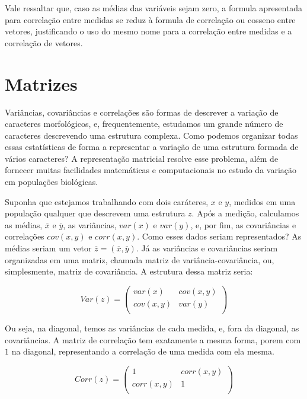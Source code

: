 \documentclass[portuges,]{tufte-handout}
\begin{document}
Vale ressaltar que, caso as médias das variáveis sejam zero, a formula
apresentada para correlação entre medidas se reduz à formula de
correlação ou cosseno entre vetores, justificando o uso do mesmo nome
para a correlação entre medidas e a correlação de vetores.

\section{Matrizes}\label{matrizes}

Variâncias, covariâncias e correlações são formas de descrever a
variação de caracteres morfológicos, e, frequentemente, estudamos um
grande número de caracteres descrevendo uma estrutura complexa. Como
podemos organizar todas essas estatísticas de forma a representar a
variação de uma estrutura formada de vários caracteres? A representação
matricial resolve esse problema, além de fornecer muitas facilidades
matemáticas e computacionais no estudo da variação em populações
biológicas.

Suponha que estejamos trabalhando com dois caráteres, $x$ e $y$, medidos
em uma população qualquer que descrevem uma estrutura $z$. Após a
medição, calculamos as médias, $\overline x$ e $\overline y$, as
variâncias, $var(x)$ e $var(y)$, e, por fim, as covariâncias e
correlações $cov(x, y)$ e $corr(x, y)$. Como esses dados seriam
representados? As médias seriam um vetor
$\overline z = (\overline x, \overline y)$. Já as variâncias e
covariâncias seriam organizadas em uma matriz, chamada matriz de
variância-covariância, ou, simplesmente, matriz de covariância. A
estrutura dessa matriz seria:

\[
Var(z) = \left (
\begin{smallmatrix}
var(x) & cov(x, y) \\
cov(x,y) & var(y)  \\
\end{smallmatrix}
\right )
\]

Ou seja, na diagonal, temos as variâncias de cada medida, e, fora da
diagonal, as covariâncias. A matriz de correlação tem exatamente a mesma
forma, porem com $1$ na diagonal, representando a correlação de uma
medida com ela mesma.

\[
Corr(z) = \left (
\begin{smallmatrix}
1 & corr(x, y) \\
corr(x,y) & 1  \\
\end{smallmatrix}
\right )
\]
\end{document}
